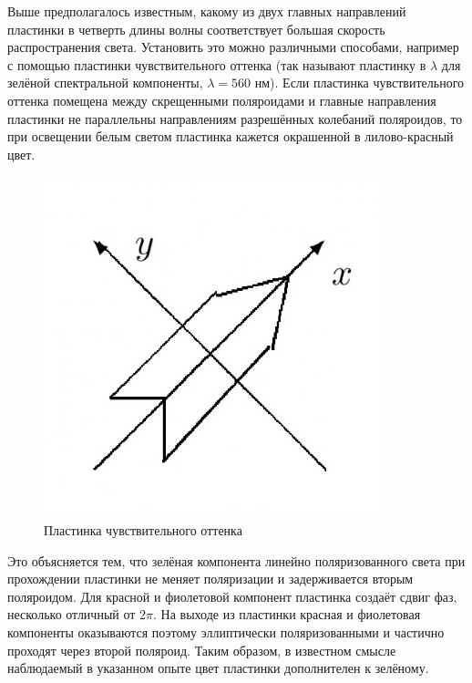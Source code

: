 \documentclass[a4paper, 12pt]{article}
\begin{document}
Выше предполагалось известным, какому из двух главных направлений пластинки в четверть длины волны соответствует большая скорость распространения света.
Установить это можно различными способами, например с помощью
пластинки чувствительного оттенка (так называют пластинку в $ \lambda $
для зелёной спектральной компоненты, $ \lambda = 560 $ нм). Если пластинка чувствительного оттенка помещена между скрещенными поляроидами и главные направления пластинки не параллельны
направлениям разрешённых колебаний поляроидов, то при освещении
белым светом пластинка кажется окрашенной в лилово-красный цвет.
\begin{figure}
	\includegraphics[width=\linewidth]{3}
	\caption{Пластинка чувствительного оттенка}
	\label{ris 3}
\end{figure}

Это объясняется тем, что зелёная компонента линейно поляризованного света при прохождении пластинки не меняет поляризации и задерживается вторым поляроидом. Для красной и фиолетовой компонент
пластинка создаёт сдвиг фаз, несколько отличный от $ 2\pi $. На выходе
из пластинки красная и фиолетовая компоненты оказываются поэтому
эллиптически поляризованными и частично проходят через второй поляроид. Таким образом, в известном смысле наблюдаемый в указанном
опыте цвет пластинки дополнителен к зелёному.
\end{document}
